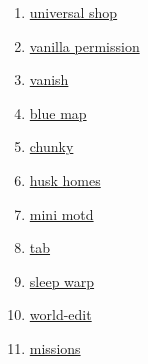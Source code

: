 \begin{enumerate}
    \item \href{https://github.com/Patbox/UniversalShops}{universal shop}
    \item \href{https://github.com/DrexHD/VanillaPermissions}{vanilla permission}
    \item \href{https://github.com/DrexHD/Vanish}{vanish}
    \item \href{https://github.com/BlueMap-Minecraft/BlueMap}{blue map}
    \item \href{https://github.com/pop4959/Chunky}{chunky}
    \item \href{https://github.com/WiIIiam278/HuskHomes/}{husk homes}
    \item \href{https://github.com/jpenilla/MiniMOTD}{mini motd}
    \item \href{https://github.com/NEZNAMY/TAB}{tab}
    \item \href{https://github.com/Giggitybyte/SleepWarp}{sleep warp}
    \item \href{https://github.com/EngineHub/WorldEdit/}{world-edit}
    \item \href{https://github.com/Kryeit/Missions}{missions}
\end{enumerate}


